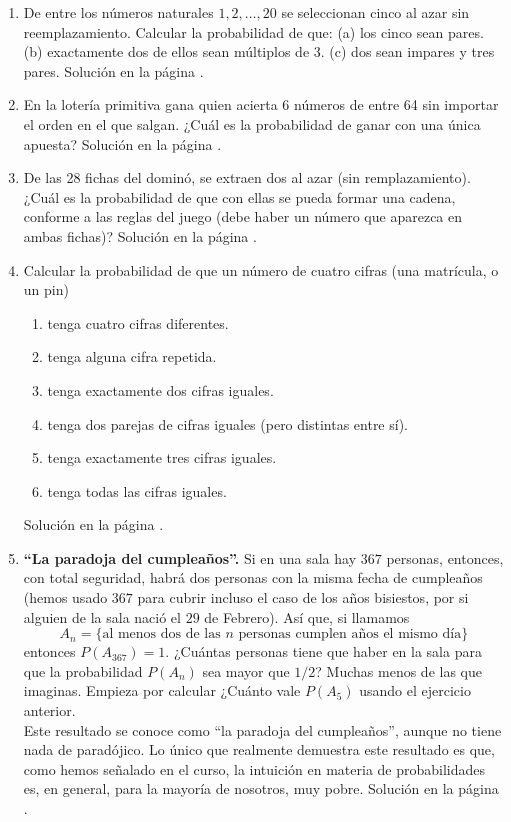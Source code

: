 \documentclass[10pt,a4paper]{article}\usepackage[]{graphicx}\usepackage[]{color}
\begin{document}
\begin{enumerate}
\item  \label{tut03:ejercicio35} De entre los números naturales $1,2,\ldots,20$ se seleccionan cinco al azar sin reemplazamiento. Calcular la probabilidad de que: (a) los cinco sean pares. (b) exactamente dos de ellos sean múltiplos de 3. (c) dos sean impares y tres pares. 
Solución en la página \pageref{tut03:ejercicio35:sol}. 

   \item \label{tut03:ejercicio36}  En la lotería primitiva gana quien acierta 6 números de entre 64 sin importar el orden en el que salgan. ¿Cuál es la probabilidad de ganar con una única apuesta? 
Solución en la página \pageref{tut03:ejercicio36:sol}. 

\item  \label{tut03:ejercicio37} De las 28 fichas del dominó, se extraen dos al azar (sin remplazamiento). ¿Cuál es la probabilidad de que con ellas se pueda formar una cadena, conforme a las reglas del juego (debe haber un número que aparezca en ambas fichas)?
Solución en la página \pageref{tut03:ejercicio37:sol}. 


\item  \label{tut03:ejercicio38} Calcular la probabilidad de que un número de cuatro cifras (una matrícula, o un pin)
\begin{enumerate}
\item tenga cuatro cifras diferentes.
\item tenga alguna cifra repetida.
\item tenga exactamente dos cifras iguales.
\item tenga dos parejas de cifras iguales (pero distintas entre sí).
\item tenga exactamente tres cifras iguales.
\item tenga todas las cifras iguales.
\end{enumerate}
Solución en la página \pageref{tut03:ejercicio38:sol}. 

\item \label{tut03:ejercicio39} {\bf ``La paradoja del cumpleaños''.} Si en una sala hay $367$ personas, entonces, con total seguridad, habrá dos personas con la misma fecha de cumpleaños (hemos usado $367$ para cubrir incluso el caso de los años bisiestos, por si alguien de la sala nació el $29$ de Febrero). Así que, si llamamos
$$A_n= \{\mbox{al menos dos de las $n$ personas cumplen años el mismo día}\}$$
entonces $P(A_{367})=1$. ¿Cuántas personas tiene que haber en la sala para que la probabilidad $P(A_{n})$ sea mayor que $1/2$? Muchas menos de las que imaginas. Empieza por calcular ¿Cuánto vale $P(A_{5})$ usando el ejercicio anterior.\\
Este resultado se conoce como ``la paradoja del cumpleaños'', aunque no tiene nada de paradójico. Lo único que realmente demuestra este resultado es que, como hemos señalado en el curso, la intuición en materia de probabilidades es, en general, para la mayoría de nosotros, muy pobre.%
Solución en la página \pageref{tut03:ejercicio39:sol}. 

\end{enumerate}
\end{document}
